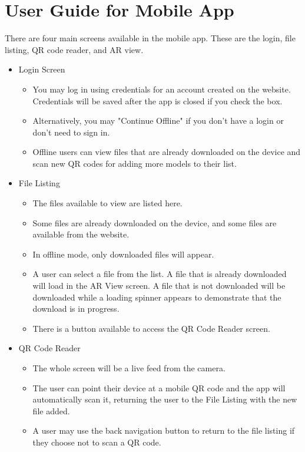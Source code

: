 \section{User Guide for Mobile App}
There are four main screens available in the mobile app. These are the login, file listing, QR code reader, and AR view. 
\begin{itemize}
    \item Login Screen
    \begin{itemize}
        \item You may log in using credentials for an account created on the website. Credentials will be saved after the app is closed if you check the box.
        \item Alternatively, you may "Continue Offline" if you don't have a login or don't need to sign in. 
        \item Offline users can view files that are already downloaded on the device and scan new QR codes for adding more models to their list.
    \end{itemize}
    \item File Listing
    \begin{itemize}
        \item The files available to view are listed here.
        \item Some files are already downloaded on the device, and some files are available from the website.
        \item In offline mode, only downloaded files will appear.
        \item A user can select a file from the list. A file that is already downloaded will load in the AR View screen. A file that is not downloaded will be downloaded while a loading spinner appears to demonstrate that the download is in progress.
        \item There is a button available to access the QR Code Reader screen.
    \end{itemize}
    \item QR Code Reader
    \begin{itemize}
        \item The whole screen will be a live feed from the camera.
        \item The user can point their device at a mobile QR code and the app will automatically scan it, returning the user to the File Listing with the new file added.
        \item A user may use the back navigation button to return to the file listing if they choose not to scan a QR code.

\end{itemize}
\end{itemize}
